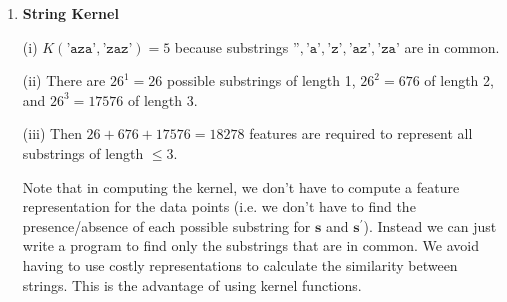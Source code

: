 \documentclass[11pt,letterpaper]{article}
\begin{document}
\begin{enumerate}
\begin{solution}
\vspace{\baselineskip}

\end{solution}



  
\newpage

\vspace{1cm}

\item {\bf  String Kernel}


\begin{solution}

\vspace{\baselineskip}

(i) $K(\texttt{'aza'},\texttt{'zaz'}) = 5$ because substrings $\texttt{''}, \texttt{'a'}, \texttt{'z'}, \texttt{'az'}, \texttt{'za'}$ are in common.

(ii) There are $26^1 = 26$ possible substrings of length 1, $26^2 = 676$ of length 2, and $26^3 = 17576$ of length 3.

(iii) Then $26 + 676 + 17576 = 18278$ features are required to represent all substrings of length $\leq 3$.

Note that in computing the kernel, we don't have to compute a feature
representation for the data points (i.e. we don't have to find the presence/absence 
of each possible substring for $\mathbf{s}$ and $\mathbf{s^\prime}$). 
Instead we can just write a program to find only the substrings that are in common. 
We avoid having to use costly representations to calculate the similarity between strings. 
This is the advantage of using kernel functions.
\vspace{\baselineskip}

\end{solution}


\end{enumerate}
\end{document}
